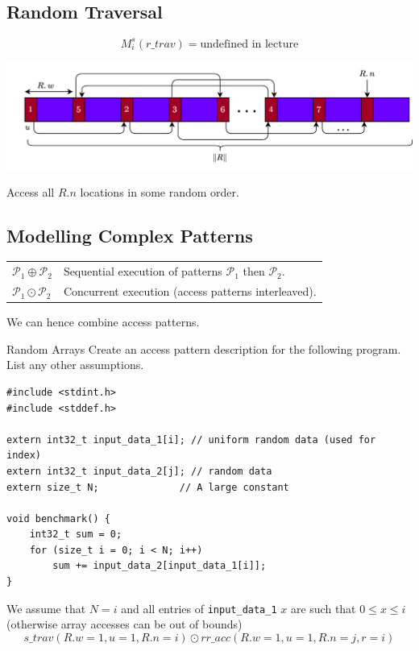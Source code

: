 \subsection{Random Traversal}
\[M_i^s(r\_trav) = \text{undefined in lecture}\]
\begin{center}
    \includegraphics[width=.8\textwidth]{modelling/images/random_traversal.drawio.png}
\end{center}
Access all $R.n$ locations in some random order.

\subsection{Modelling Complex Patterns}
\begin{center}
    \begin{tabular}{l p{}}
        $\mathcal{P}_1 \oplus \mathcal{P}_2$ & Sequential execution of patterns $\mathcal{P}_1$ then $\mathcal{P}_2$. \\
        $\mathcal{P}_1 \odot  \mathcal{P}_2$ & Concurrent execution (access patterns interleaved). \\
    \end{tabular}
\end{center}
We can hence combine access patterns.

\begin{examplebox}{Random Arrays}
    Create an access pattern description for the following program.
    List any other assumptions.
\begin{verbatim}
#include <stdint.h>
#include <stddef.h>

extern int32_t input_data_1[i]; // uniform random data (used for index)
extern int32_t input_data_2[j]; // random data
extern size_t N;              // A large constant

void benchmark() {
    int32_t sum = 0;
    for (size_t i = 0; i < N; i++)
        sum += input_data_2[input_data_1[i]];
}
\end{verbatim}
    \tcblower
    We assume that $N = i$ and all entries of \texttt{input_data_1} $x$  are such that $0 \leq x \leq i$ (otherwise array accesses can be out of bounds)
    \[s\_trav(R.w = 1, u = 1, R.n = i) \odot rr\_acc (R.w = 1, u = 1, R.n = j, r = i)\]
\end{examplebox}

